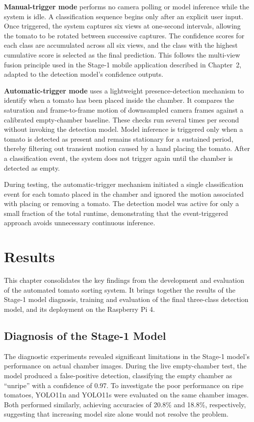 \documentclass[12pt,a4paper]{report}
\begin{document}
\textbf{Manual-trigger mode} performs no camera polling or model inference while the system is idle. A classification sequence begins only after an explicit user input. Once triggered, the system captures six views at one-second intervals, allowing the tomato to be rotated between successive captures. The confidence scores for each class are accumulated across all six views, and the class with the highest cumulative score is selected as the final prediction. This follows the multi-view fusion principle used in the Stage-1 mobile application described in Chapter~2, adapted to the detection model's confidence outputs.

\textbf{Automatic-trigger mode} uses a lightweight presence-detection mechanism to identify when a tomato has been placed inside the chamber. It compares the saturation and frame-to-frame motion of downsampled camera frames against a calibrated empty-chamber baseline. These checks run several times per second without invoking the detection model. Model inference is triggered only when a tomato is detected as present and remains stationary for a sustained period, thereby filtering out transient motion caused by a hand placing the tomato. After a classification event, the system does not trigger again until the chamber is detected as empty.

During testing, the automatic-trigger mechanism initiated a single classification event for each tomato placed in the chamber and ignored the motion associated with placing or removing a tomato. The detection model was active for only a small fraction of the total runtime, demonstrating that the event-triggered approach avoids unnecessary continuous inference.

\chapter{Results}

This chapter consolidates the key findings from the development and evaluation of the automated tomato sorting system. It brings together the results of the Stage-1 model diagnosis, training and evaluation of the final three-class detection model, and its deployment on the Raspberry Pi 4.
\section{Diagnosis of the Stage-1 Model}

The diagnostic experiments revealed significant limitations in the Stage-1 model's performance on actual chamber images. During the live empty-chamber test, the model produced a false-positive detection, classifying the empty chamber as ``unripe'' with a confidence of 0.97. To investigate the poor performance on ripe tomatoes, YOLO11n and YOLO11s were evaluated on the same chamber images. Both performed similarly, achieving accuracies of 20.8\% and 18.8\%, respectively, suggesting that increasing model size alone would not resolve the problem.
\end{document}
